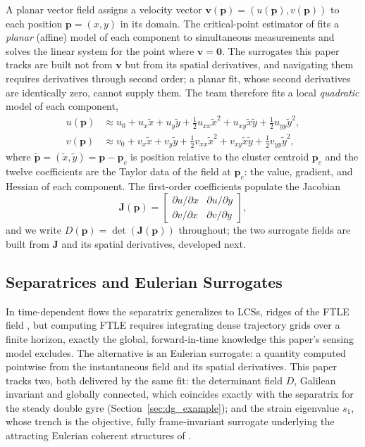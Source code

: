 \documentclass[lettersize,journal]{IEEEtran}
\begin{document}
A planar vector field assigns a velocity vector $\mathbf{v}(\mathbf{p}) =
(u(\mathbf{p}), v(\mathbf{p}))$ to each position $\mathbf{p} = (x, y)$ in its
domain. The critical-point estimator of \cite{14} fits a \emph{planar}
(affine) model of each component to simultaneous measurements and solves
the linear system for the point where $\mathbf{v} = \mathbf{0}$. The
surrogates this paper tracks are built not from $\mathbf{v}$ but from its
spatial derivatives, and navigating them requires derivatives through
second order; a planar fit, whose second derivatives are identically zero,
cannot supply them. The team therefore fits a local \emph{quadratic} model
of each component,
\begin{align}
    u(\mathbf{p}) &\approx u_0 + u_x \tilde{x}
        + u_y \tilde{y} + \tfrac{1}{2} u_{xx} \tilde{x}^2
        + u_{xy} \tilde{x}\tilde{y} + \tfrac{1}{2} u_{yy} \tilde{y}^2,
        \label{eq:quad_model_u} \\
    v(\mathbf{p}) &\approx v_0 + v_x \tilde{x}
        + v_y \tilde{y} + \tfrac{1}{2} v_{xx} \tilde{x}^2
        + v_{xy} \tilde{x}\tilde{y} + \tfrac{1}{2} v_{yy} \tilde{y}^2,
        \label{eq:quad_model_v}
\end{align}
where $\tilde{\mathbf{p}} = (\tilde{x}, \tilde{y}) = \mathbf{p} - \mathbf{p}_c$
is position relative to the cluster centroid $\mathbf{p}_c$ and the twelve
coefficients are the Taylor data of the field at $\mathbf{p}_c$: the value,
gradient, and Hessian of each component. The first-order coefficients
populate the Jacobian
\begin{equation}
    \mathbf{J}(\mathbf{p}) =
    \begin{bmatrix}
        \partial u / \partial x & \partial u / \partial y \\
        \partial v / \partial x & \partial v / \partial y
    \end{bmatrix},
    \label{eq:jacobian}
\end{equation}
and we write $D(\mathbf{p}) = \det(\mathbf{J}(\mathbf{p}))$ throughout; the
two surrogate fields are built from $\mathbf{J}$ and its spatial
derivatives, developed next.

\subsection{Separatrices and Eulerian Surrogates}
\label{sec:separatrix}

In time-dependent flows the separatrix generalizes to LCSs, ridges of
the FTLE field \cite{6,7,8}, but computing FTLE requires integrating
dense trajectory grids over a finite horizon, exactly the global,
forward-in-time knowledge this paper's sensing model excludes. The
alternative is an Eulerian surrogate: a quantity computed pointwise
from the instantaneous field and its spatial derivatives. This paper
tracks two, both delivered by the same fit: the determinant field $D$,
Galilean invariant and globally connected, which coincides exactly with
the separatrix for the steady double gyre
(Section~\ref{sec:dg_example}); and the strain eigenvalue $s_1$, whose
trench is the objective, fully frame-invariant surrogate underlying the
attracting Eulerian coherent structures of \cite{17,18}.
\end{document}
